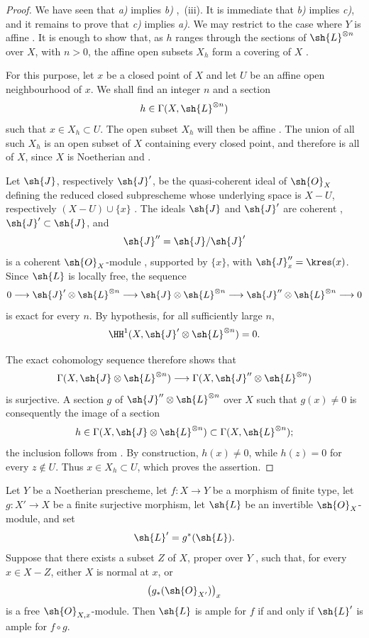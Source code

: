 \begin{proof}
We have seen that \emph{a)} implies \emph{b)} ,~(iii).
It is immediate that \emph{b)} implies \emph{c)}, and it remains to prove
that \emph{c)} implies \emph{a)}.
We may restrict to the case where $Y$ is affine .
It is enough to show that, as $h$ ranges through the sections of
$\sh{L}^{\otimes n}$ over $X$, with $n>0$, the affine open subsets $X_h$
form a covering of $X$ .

For this purpose, let $x$ be a closed point of $X$ and let $U$ be an
affine open neighbourhood of $x$.
We shall find an integer $n$ and a section
\[
  h\in\Gamma(X,\sh{L}^{\otimes n})
\]
such that $x\in X_h\subset U$.
The open subset $X_h$ will then be affine .
The union of all such $X_h$ is an open subset of $X$ containing every
closed point, and therefore is all of $X$, since $X$ is Noetherian
 and .

Let $\sh{J}$, respectively $\sh{J}'$, be the quasi-coherent ideal of
$\sh{O}_X$ defining the reduced closed subprescheme whose underlying
space is $X-U$, respectively $(X-U)\cup\{x\}$ .
The ideals $\sh{J}$ and $\sh{J}'$ are coherent ,
$\sh{J}'\subset\sh{J}$, and
\[
  \sh{J}''=\sh{J}/\sh{J}'
\]
is a coherent $\sh{O}_X$-module , supported by
$\{x\}$, with $\sh{J}''_x=\kres(x)$.
Since $\sh{L}$ is locally free, the sequence
\[
  0\longrightarrow
  \sh{J}'\otimes\sh{L}^{\otimes n}
  \longrightarrow
  \sh{J}\otimes\sh{L}^{\otimes n}
  \longrightarrow
  \sh{J}''\otimes\sh{L}^{\otimes n}
  \longrightarrow0
\]
is exact for every $n$.
By hypothesis, for all sufficiently large $n$,
\[
  \HH^1(X,\sh{J}'\otimes\sh{L}^{\otimes n})=0.
\]


The exact cohomology sequence therefore shows that
\[
  \Gamma(X,\sh{J}\otimes\sh{L}^{\otimes n})
  \longrightarrow
  \Gamma(X,\sh{J}''\otimes\sh{L}^{\otimes n})
\]
is surjective.
A section $g$ of $\sh{J}''\otimes\sh{L}^{\otimes n}$ over $X$ such that
$g(x)\neq0$ is consequently the image of a section
\[
  h\in\Gamma(X,\sh{J}\otimes\sh{L}^{\otimes n})
  \subset\Gamma(X,\sh{L}^{\otimes n});
\]
the inclusion follows from .
By construction, $h(x)\neq0$, while $h(z)=0$ for every $z\notin U$.
Thus $x\in X_h\subset U$, which proves the assertion.
\end{proof}

\begin{proposition}[2.6.2]
\label{III.2.6.2}
Let $Y$ be a Noetherian prescheme, let $f:X\to Y$ be a morphism of
finite type, let $g:X'\to X$ be a finite surjective morphism, let
$\sh{L}$ be an invertible $\sh{O}_X$-module, and set
\[
  \sh{L}'=g^*(\sh{L}).
\]
Suppose that there exists a subset $Z$ of $X$, proper over $Y$
, such that, for every $x\in X-Z$, either $X$ is
normal at $x$, or
\[
  \bigl(g_*(\sh{O}_{X'})\bigr)_x
\]
is a free $\sh{O}_{X,x}$-module.
Then $\sh{L}$ is ample for $f$ if and only if $\sh{L}'$ is ample for
$f\circ g$.
\end{proposition}

